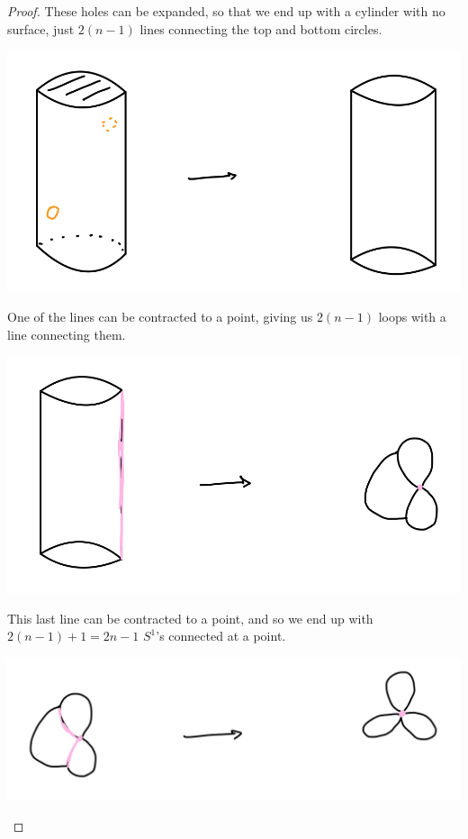 \documentclass[12pt]{article}
\begin{document}
\begin{proof}
  \par These holes can be expanded, so that we end up with a cylinder with no surface, just $2(n-1)$ lines connecting the top and bottom circles.
  \par \begin{center} \includegraphics[scale=.2]{2-3.jpg} \end{center}
  \par One of the lines can be contracted to a point, giving us $2(n-1)$ loops with a line connecting them.
  \par \begin{center} \includegraphics[scale=.2]{2-4.jpg} \end{center}
  \par This last line can be contracted to a point, and so we end up with $2(n-1)+1=2n-1$ $S^1$'s connected at a point.
  \par \begin{center} \includegraphics[scale=.2]{2-5.jpg} \end{center}

\end{proof}
\end{document}
